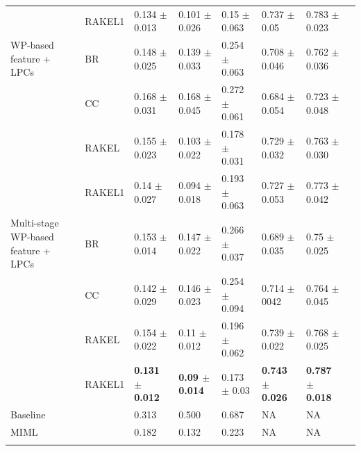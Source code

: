 \begin{table}[htb!]
{\begin{tabular}{llllllll}
                          & RAKEL1           & 0.134 $\pm$ 0.013           & 0.101 $\pm$ 0.026        & 0.15 $\pm$ 0.063         & 0.737 $\pm$ 0.05                 & 0.783 $\pm$ 0.023       \\ 
WP-based feature + LPCs             & BR              & 0.148 $\pm$ 0.025           & 0.139 $\pm$ 0.033      & 0.254 $\pm$ 0.063        & 0.708 $\pm$ 0.046                & 0.762 $\pm$ 0.036       \\ 
                          & CC              & 0.168 $\pm$ 0.031           & 0.168 $\pm$ 0.045        & 0.272 $\pm$ 0.061        & 0.684 $\pm$ 0.054                & 0.723 $\pm$ 0.048       \\ 
                          & RAKEL           & 0.155 $\pm$ 0.023           & 0.103 $\pm$ 0.022        & 0.178 $\pm$ 0.031        & 0.729 $\pm$ 0.032                & 0.763 $\pm$ 0.030       \\ 
                          & RAKEL1           & 0.14 $\pm$ 0.027            & 0.094 $\pm$ 0.018         & 0.193 $\pm$ 0.063        & 0.727 $\pm$ 0.053                & 0.773 $\pm$ 0.042       \\ 
Multi-stage WP-based feature + LPCs & BR              & 0.153 $\pm$ 0.014           & 0.147 $\pm$ 0.022      & 0.266 $\pm$ 0.037        & 0.689 $\pm$ 0.035                & 0.75 $\pm$ 0.025        \\ 
                          & CC              & 0.142 $\pm$ 0.029           & 0.146 $\pm$ 0.023        & 0.254 $\pm$ 0.094        & 0.714 $\pm$ 0042                 & 0.764 $\pm$ 0.045       \\ 
                          & RAKEL           & 0.154 $\pm$ 0.022           & 0.11 $\pm$ 0.012         & 0.196 $\pm$ 0.062        & 0.739 $\pm$ 0.022                & 0.768 $\pm$ 0.025       \\ 
                          & RAKEL1           & \textbf{0.131 $\pm$ 0.012          } & \textbf{0.09 $\pm$ 0.014}                       & 0.173 $\pm$ 0.03         & \textbf{0.743 $\pm$ 0.026}               & \textbf{0.787 $\pm$ 0.018}      
\\ \hline
Baseline &               & 0.313           & 0.500      & 0.687        & NA                & NA
\\ \hline
MIML & &    0.182           & 0.132      & 0.223        & NA                & NA                        
                          
                          
                           \\ \hhline{========}
\end{tabular}
}
\end{table}




